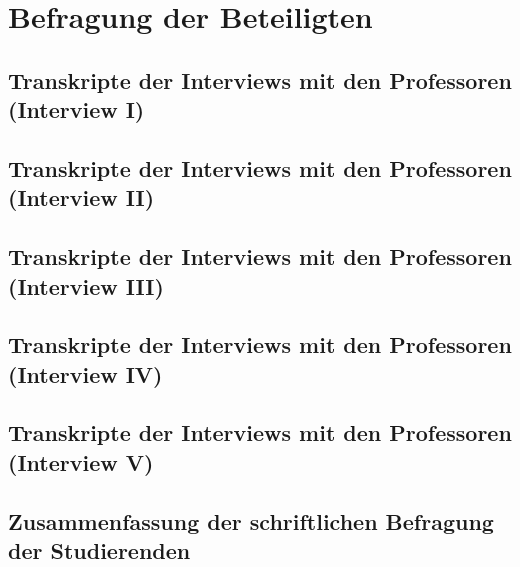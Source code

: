\documentclass[bibliography=totoc,listof=totoc,BCOR=5mm,DIV=12,oneside]{scrbook}
\begin{document}
{\newpage
\section{Befragung der Beteiligten}
\label{anhang:interviewProfessorenTranskripte}
\newpage
\subsection{Transkripte der Interviews mit den Professoren (Interview I)}
\label{anhang:interviewProfessorenTranskripteInterviewI}


\subsection{Transkripte der Interviews mit den Professoren (Interview II)}
\label{anhang:interviewProfessorenTranskripteInterviewI}


\subsection{Transkripte der Interviews mit den Professoren (Interview III)}
\label{anhang:interviewProfessorenTranskripteInterviewI}


\subsection{Transkripte der Interviews mit den Professoren (Interview IV)}
\label{anhang:interviewProfessorenTranskripteInterviewI}


\subsection{Transkripte der Interviews mit den Professoren (Interview V)}
\label{anhang:interviewProfessorenTranskripteInterviewI}


\newpage
\subsection{Zusammenfassung der schriftlichen Befragung der Studierenden}
\label{anhang:schriftlicheBefragungStudierendeZusammenfassung}


}
\end{document}
